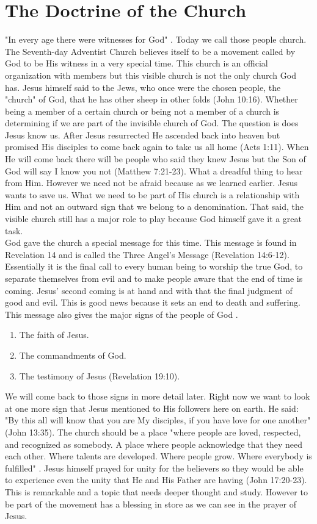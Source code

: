 \section{The Doctrine of the Church}
"In every age there were witnesses for God" \citep[p. 61]{white1911GC}. Today we call those people church. The Seventh-day Adventist Church believes itself to be a movement called by God to be His witness in a very special time. This church is an official organization with members but this visible church is not the only church God has. Jesus himself said to the Jews, who once were the chosen people, the "church" of God, that he has other sheep in other folds (John 10:16). Whether being a member of a certain church or being not a member of a church is determining if we are part of the invisible church of God. The question is does Jesus know us. After Jesus resurrected He ascended back into heaven but promised His disciples to come back again to take us all home (Acts 1:11). When He will come back there will be people who said they knew Jesus but the Son of God will say I know you not (Matthew 7:21-23). What a dreadful thing to hear from Him. However we need not be afraid because as we learned earlier. Jesus wants to save us. What we need to be part of His church is a relationship with Him and not an outward sign that we belong to a denomination. That said, the visible church still has a major role to play because God himself gave it a great task.\\
God gave the church a special message for this time. This message is found in Revelation 14 and is called the Three Angel's Message (Revelation 14:6-12). Essentially it is the final call to every human being to worship the true God, to separate themselves from evil and to make people aware that the end of time is coming. Jesus' second coming is at hand and with that the final judgment of good and evil. This is good news because it sets an end to death and suffering. This message also gives the major signs of the people of God \citep{ministerial1988seventh}.
\begin{enumerate}
\item The faith of Jesus.
\item The commandments of God.
\item The testimony of Jesus (Revelation 19:10).
\end{enumerate}
We will come back to those signs in more detail later. Right now we want to look at one more sign that Jesus mentioned to His followers here on earth. He said: "By this all will know that you are My disciples, if you have love for one another" (John 13:35). The church should be a place "where people are loved, respected, and recognized as somebody. A place where people acknowledge that they need each other. Where talents are developed. Where people grow. Where everybody is fulfilled" \citep[p. 15]{Bradford1986church}. Jesus himself prayed for unity for the believers so they would be able to experience even the unity that He and His Father are having (John 17:20-23). This is remarkable and a topic that needs deeper thought and study. However to be part of the movement has a blessing in store as we can see in the prayer of Jesus.
